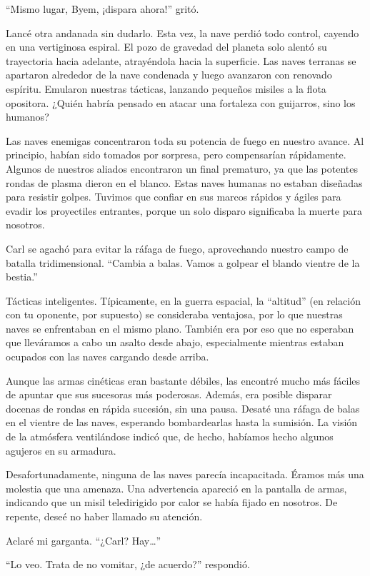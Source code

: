 “Mismo lugar, Byem, ¡dispara ahora!” gritó.

Lancé otra andanada sin dudarlo. Esta vez, la nave perdió todo control, cayendo en una vertiginosa espiral. El pozo de gravedad del planeta solo alentó su trayectoria hacia adelante, atrayéndola hacia la superficie. Las naves terranas se apartaron alrededor de la nave condenada y luego avanzaron con renovado espíritu. Emularon nuestras tácticas, lanzando pequeños misiles a la flota opositora. ¿Quién habría pensado en atacar una fortaleza con guijarros, sino los humanos?

Las naves enemigas concentraron toda su potencia de fuego en nuestro avance. Al principio, habían sido tomados por sorpresa, pero compensarían rápidamente. Algunos de nuestros aliados encontraron un final prematuro, ya que las potentes rondas de plasma dieron en el blanco. Estas naves humanas no estaban diseñadas para resistir golpes. Tuvimos que confiar en sus marcos rápidos y ágiles para evadir los proyectiles entrantes, porque un solo disparo significaba la muerte para nosotros.

Carl se agachó para evitar la ráfaga de fuego, aprovechando nuestro campo de batalla tridimensional. “Cambia a balas. Vamos a golpear el blando vientre de la bestia.”

Tácticas inteligentes. Típicamente, en la guerra espacial, la “altitud” (en relación con tu oponente, por supuesto) se consideraba ventajosa, por lo que nuestras naves se enfrentaban en el mismo plano. También era por eso que no esperaban que lleváramos a cabo un asalto desde abajo, especialmente mientras estaban ocupados con las naves cargando desde arriba.

Aunque las armas cinéticas eran bastante débiles, las encontré mucho más fáciles de apuntar que sus sucesoras más poderosas. Además, era posible disparar docenas de rondas en rápida sucesión, sin una pausa. Desaté una ráfaga de balas en el vientre de las naves, esperando bombardearlas hasta la sumisión. La visión de la atmósfera ventilándose indicó que, de hecho, habíamos hecho algunos agujeros en su armadura.

Desafortunadamente, ninguna de las naves parecía incapacitada. Éramos más una molestia que una amenaza. Una advertencia apareció en la pantalla de armas, indicando que un misil teledirigido por calor se había fijado en nosotros. De repente, deseé no haber llamado su atención.

Aclaré mi garganta. “¿Carl? Hay…”

“Lo veo. Trata de no vomitar, ¿de acuerdo?” respondió.

